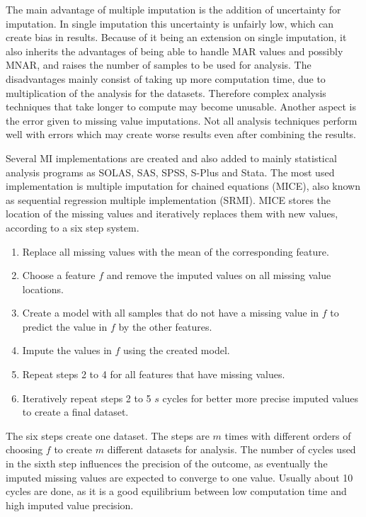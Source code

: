 \documentclass[10pt,a4paper]{article}
\begin{document}
	The main advantage of multiple imputation is the addition of uncertainty for imputation. In single imputation this uncertainty is unfairly low, which can create bias in results. Because of it being an extension on single imputation, it also inherits the advantages of being able to handle MAR values and possibly MNAR, and raises the number of samples to be used for analysis\cite{van2006imputation, pedersen2017missing}. The disadvantages mainly consist of taking up more computation time, due to multiplication of the analysis for the datasets. Therefore complex analysis techniques that take longer to compute may become unusable. Another aspect is the error given to missing value imputations. Not all analysis techniques perform well with errors which may create worse results even after combining the results\cite{pedersen2017missing}.
	
	Several MI implementations are created and also added to mainly statistical analysis programs as SOLAS, SAS, SPSS, S-Plus and Stata\cite{horton2001multiple, allison2000multiple, royston2011multiple}. The most used implementation is multiple imputation for chained equations (MICE)\cite{azur2011multiple, royston2004multiple}, also known as sequential regression multiple implementation (SRMI)\cite{he2010multiple}. MICE stores the location of the missing values and iteratively replaces them with new values, according to a six step system\cite{azur2011multiple}. 
	
	\begin{enumerate}
		\item Replace all missing values with the mean of the corresponding feature.
		\item Choose a feature $f$ and remove the imputed values on all missing value locations.
		\item Create a model with all samples that do not have a missing value in $f$ to predict the value in $f$ by the other features.
		\item Impute the values in $f$ using the created model.
		\item Repeat steps 2 to 4 for all features that have missing values.
		\item Iteratively repeat steps 2 to 5 $s$ cycles for better more precise imputed values to create a final dataset.
	\end{enumerate}

	The six steps create one dataset. The steps are $m$ times with different orders of choosing $f$ to create $m$ different datasets for analysis. The number of cycles used in the sixth step influences the precision of the outcome, as eventually the imputed missing values are expected to converge to one value. Usually about 10 cycles are done, as it is a good equilibrium between low computation time and high imputed value precision\cite{azur2011multiple, royston2004multiple}.
	
\end{document}
